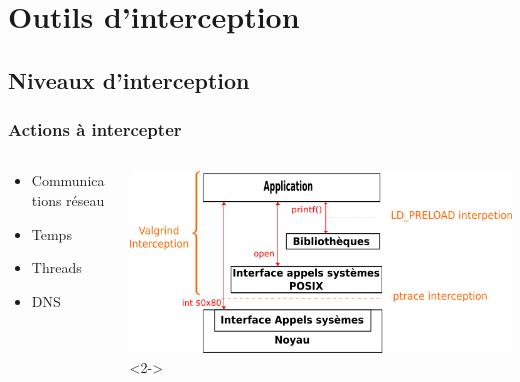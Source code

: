 \documentclass[10.5pt]{beamer}
\begin{document}
\section{Outils d'interception}
\subsection{Niveaux d'interception}
\begin{frame}
  \frametitle{Actions à intercepter}
  \begin{columns}[c]
    \begin{column}{4cm}
      \begin{itemize}
      \item Communications réseau
      \item Temps
      \item Threads
      \item DNS
      \end{itemize}
    \end{column}
    \begin{column}{7cm}
        \includegraphics[scale=0.4]{Pictures/png/Communication_application_noyau_v3.png}<2->
  \end{column}
\end{columns}        
\end{frame}
\end{document}
